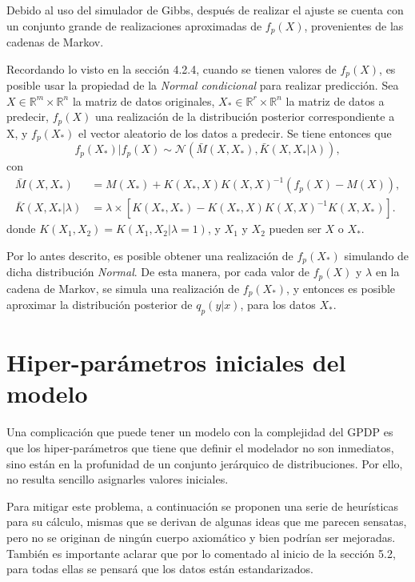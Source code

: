 Debido al uso del simulador de Gibbs, despu\'es de realizar el ajuste se cuenta con un conjunto grande de realizaciones aproximadas de $f_p(X)$, provenientes de las cadenas de Markov.

Recordando lo visto en la secci\'on 4.2.4, cuando se tienen valores de $f_p(X)$, es posible usar la propiedad de la \textit{Normal condicional} para realizar predicci\'on. Sea $X \in \mathbb{R}^m \times \mathbb{R}^n$ la matriz de datos originales, $X_* \in \mathbb{R}^r \times \mathbb{R}^n$ la matriz de datos a predecir, $f_p(X)$ una realizaci\'on de la distribuci\'on posterior correspondiente a X, y $f_p(X_*)$ el vector aleatorio de los datos a predecir. Se tiene entonces que 
\begin{equation*}
    f_p(X_*)|f_p(X) 
    \sim \mathcal{N}
    (\bar{M}(X,X_*),\bar{K}(X,X_*|\lambda)),
\end{equation*}
con
\begin{equation*}
\begin{aligned}
    \bar{M}(X,X_*) &= M(X_*) + K(X_*,X)K(X,X)^{-1}(f_p(X) - M(X)), \\
    \bar{K}(X,X_*|\lambda) &= 
    \lambda
    \times
    \left[
    K(X_*,X_*) -
    K(X_*,X)K(X,X)^{-1}K(X,X_*)
    \right]
    .
\end{aligned}
\end{equation*}
donde $K(X_1,X_2) = K(X_1,X_2|\lambda=1)$, y $X_1$ y $X_2$ pueden ser $X$ o $X_*$.

Por lo antes descrito, es posible obtener una realizaci\'on de $f_p(X_*)$ simulando de dicha distribuci\'on \textit{Normal}. De esta manera, por cada valor de $f_p(X)$ y $\lambda$ en la cadena de Markov, se simula una realizaci\'on de $f_p(X_*)$, y entonces es posible aproximar la distribuci\'on posterior de $q_p(y|x)$, para los datos $X_*$.

\section{Hiper-par\'ametros iniciales del modelo}

Una complicaci\'on que puede tener un modelo con la complejidad del GPDP es que los hiper-par\'ametros que tiene que definir el modelador no son inmediatos, sino est\'an en la profunidad de un conjunto jer\'arquico de distribuciones. Por ello, no resulta sencillo asignarles valores iniciales.

Para mitigar este problema, a continuaci\'on se proponen una serie de heur\'isticas para su c\'alculo, mismas que se derivan de algunas ideas que me parecen sensatas, pero no se originan de ning\'un cuerpo axiom\'atico y bien podr\'ian ser mejoradas. Tambi\'en es importante aclarar que por lo comentado al inicio de la secci\'on 5.2, para todas ellas se pensar\'a que los datos est\'an estandarizados.

